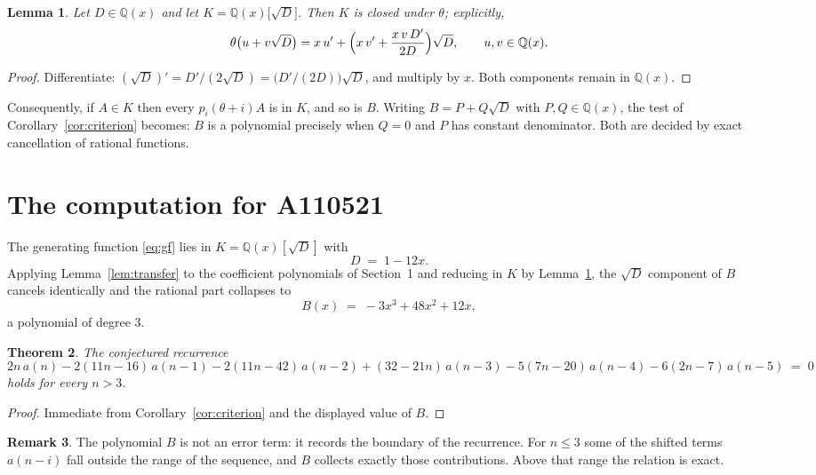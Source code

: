 \documentclass[11pt,a4paper]{article}
\theoremstyle{plain}
\newtheorem{theorem}{Theorem}
\newtheorem{lemma}[theorem]{Lemma}
\theoremstyle{definition}
\newtheorem{remark}[theorem]{Remark}
\begin{document}
\begin{lemma}\label{lem:field}
Let $D\in\mathbb{Q}(x)$ and let $K=\mathbb{Q}(x)\bigl[\sqrt{D}\bigr]$. Then $K$ is closed
under $\theta$; explicitly,
\[
\theta\bigl(u+v\sqrt{D}\bigr)=x\,u'+\Bigl(x\,v'+\frac{x\,v\,D'}{2D}\Bigr)\sqrt{D},
\qquad u,v\in\mathbb{Q}(x).
\]
\end{lemma}

\begin{proof}
Differentiate: $(\sqrt{D})'=D'/(2\sqrt{D})=\bigl(D'/(2D)\bigr)\sqrt{D}$, and multiply by
$x$. Both components remain in $\mathbb{Q}(x)$.
\end{proof}

Consequently, if $A\in K$ then every $p_{i}(\theta+i)A$ is in $K$, and so is $B$. Writing
$B=P+Q\sqrt{D}$ with $P,Q\in\mathbb{Q}(x)$, the test of Corollary~\ref{cor:criterion}
becomes: $B$ is a polynomial precisely when $Q=0$ and $P$ has constant denominator. Both
are decided by exact cancellation of rational functions.

\section{The computation for A110521}

The generating function \eqref{eq:gf} lies in $K=\mathbb{Q}(x)[\sqrt{D}]$ with
\[
D \;=\; 1 - 12 x .
\]
Applying Lemma~\ref{lem:transfer} to the coefficient polynomials of Section~1 and reducing
in $K$ by Lemma~\ref{lem:field}, the $\sqrt{D}$ component of $B$ cancels identically and
the rational part collapses to
\[
B(x)\;=\;- 3 x^{3} + 48 x^{2} + 12 x ,
\]
a polynomial of degree $3$.

\begin{theorem}
The conjectured recurrence
\[
2 n\,a(n) -  2 \left(11 n - 16\right)\,a(n-1) -  2 \left(11 n - 42\right)\,a(n-2) + (32 - 21 n)\,a(n-3) -  5 \left(7 n - 20\right)\,a(n-4) -  6 \left(2 n - 7\right)\,a(n-5) \;=\;0
\]
holds for every $n>3$.
\end{theorem}

\begin{proof}
Immediate from Corollary~\ref{cor:criterion} and the displayed value of $B$.
\end{proof}

\begin{remark}
The polynomial $B$ is not an error term: it records the boundary of the recurrence. For
$n\le3$ some of the shifted terms $a(n-i)$ fall outside the range of the sequence,
and $B$ collects exactly those contributions. Above that range the relation is exact.
\end{remark}
\end{document}
